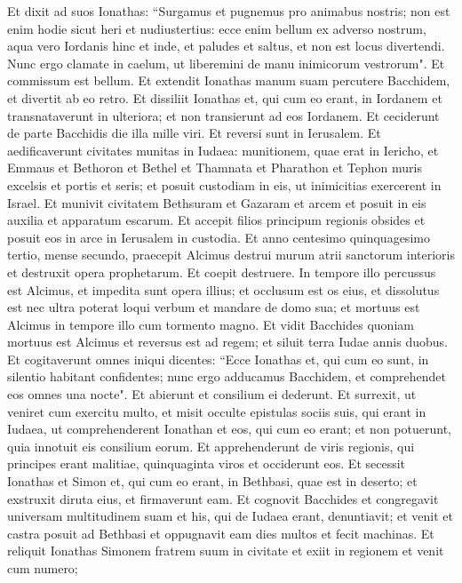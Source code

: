 \begin{biblechapter}
\verse Et dixit ad suos Ionathas: “Surgamus et pugnemus pro animabus nostris; non est enim hodie sicut heri et nudiustertius: 
\verse ecce enim bellum ex adverso nostrum, aqua vero Iordanis hinc et inde, et paludes et saltus, et non est locus divertendi. 
\verse Nunc ergo clamate in caelum, ut liberemini de manu inimicorum vestrorum". Et commissum est bellum. 
\verse Et extendit Ionathas manum suam percutere Bacchidem, et divertit ab eo retro.  
\verse Et dissiliit Ionathas et, qui cum eo erant, in Iordanem et transnataverunt in ulteriora; et non transierunt ad eos Iordanem. 
\verse Et ceciderunt de parte Bacchidis die illa mille viri. Et reversi sunt in Ierusalem. 
\verse Et aedificaverunt civitates munitas in Iudaea: munitionem, quae erat in Iericho, et Emmaus et Bethoron et Bethel et Thamnata et Pharathon et Tephon muris excelsis et portis et seris; 
\verse et posuit custodiam in eis, ut inimicitias exercerent in Israel. 
\verse Et munivit civitatem Bethsuram et Gazaram et arcem et posuit in eis auxilia et apparatum escarum. 
\verse Et accepit filios principum regionis obsides et posuit eos in arce in Ierusalem in custodia. 
\verse Et anno centesimo quinquagesimo tertio, mense secundo, praecepit Alcimus destrui murum atrii sanctorum interioris et destruxit opera prophetarum. Et coepit destruere. 
\verse In tempore illo percussus est Alcimus, et impedita sunt opera illius; et occlusum est os eius, et dissolutus est nec ultra poterat loqui verbum et mandare de domo sua; 
\verse et mortuus est Alcimus in tempore illo cum tormento magno. 
\verse Et vidit Bacchides quoniam mortuus est Alcimus et reversus est ad regem; et siluit terra Iudae annis duobus. 
\verse Et cogitaverunt omnes iniqui dicentes: “Ecce Ionathas et, qui cum eo sunt, in silentio habitant confidentes; nunc ergo adducamus Bacchidem, et comprehendet eos omnes una nocte". 
\verse Et abierunt et consilium ei dederunt. 
\verse Et surrexit, ut veniret cum exercitu multo, et misit occulte epistulas sociis suis, qui erant in Iudaea, ut comprehenderent Ionathan et eos, qui cum eo erant; et non potuerunt, quia innotuit eis consilium eorum. 
\verse Et apprehenderunt de viris regionis, qui principes erant malitiae, quinquaginta viros et occiderunt eos. 
\verse Et secessit Ionathas et Simon et, qui cum eo erant, in Bethbasi, quae est in deserto; et exstruxit diruta eius, et firmaverunt eam. 
\verse Et cognovit Bacchides et congregavit universam multitudinem suam et his, qui de Iudaea erant, denuntiavit; 
\verse et venit et castra posuit ad Bethbasi et oppugnavit eam dies multos et fecit machinas. 
\verse Et reliquit Ionathas Simonem fratrem suum in civitate et exiit in regionem et venit cum numero;  

\end{biblechapter}
